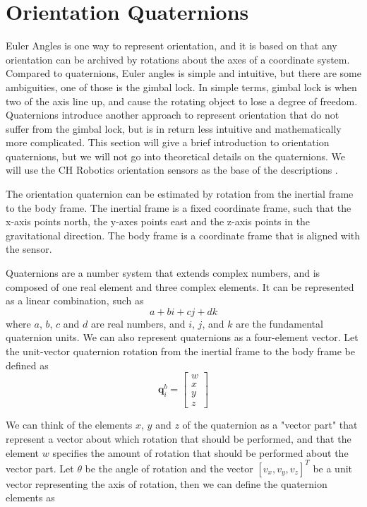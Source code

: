 \section{Orientation Quaternions}
\label{sec:quaternion}
Euler Angles is one way to represent orientation, and it is based on that any orientation can be archived by rotations about the axes of a coordinate system. Compared to quaternions, Euler angles is simple and intuitive, but there are some ambiguities, one of those is the gimbal lock. In simple terms, gimbal lock is when two of the axis line up, and cause the rotating object to lose a degree of freedom. Quaternions introduce another approach to represent orientation that do not suffer from the gimbal lock, but is in return less intuitive and mathematically more complicated. This section will give a brief introduction to orientation quaternions, but we will not go into theoretical details on the quaternions. We will use the CH Robotics orientation sensors as the base of the descriptions \cite{CH_Robotics}.

The orientation quaternion can be estimated by rotation from the inertial frame to the body frame. The inertial frame is a fixed coordinate frame, such that the x-axis points north, the y-axes points east and the z-axis points in the gravitational direction. The body frame is a coordinate frame that is aligned with the sensor.

Quaternions are a number system that extends complex numbers, and is composed of one real element and three complex elements. It can be represented as a linear combination, such as
\begin{equation*}
    a + bi + cj + dk
\end{equation*}
where $a$, $b$,  $c$ and $d$ are real numbers, and $i$, $j$, and $k$ are the fundamental quaternion units. We can also represent quaternions as a four-element vector. Let the unit-vector quaternion rotation from the inertial frame to the body frame be defined as
\begin{equation*}
    \mathbf{q}^{b}_{i} = \begin{bmatrix}
            w \\
            x \\
            y \\
            z
        \end{bmatrix}
\end{equation*}

We can think of the elements $x$, $y$ and $z$ of the quaternion as a "vector part" that represent a vector about which rotation that should be performed, and that the element $w$ specifies the amount of rotation that should be performed about the vector part. Let $\theta$ be the angle of rotation and the vector $[v_x,v_y,v_z]^T$ be a unit vector representing the axis of rotation, then we can define the quaternion elements as

